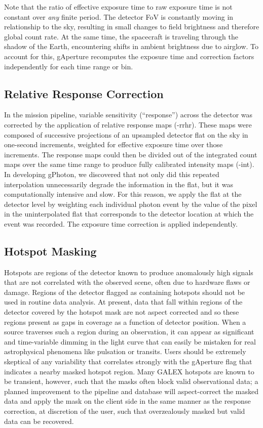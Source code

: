 \documentclass[iop]{emulateapj}
\begin{document}
Note that the ratio of effective exposure time to raw exposure time is not constant over \emph{any} finite period. The detector FoV is constantly moving in relationship to the sky, resulting in small changes to field brightness and therefore global count rate. At the same time, the spacecraft is traveling through the shadow of the Earth, encountering shifts in ambient brightness due to airglow. To account for this, gAperture recomputes the exposure time and correction factors independently for each time range or bin.

\subsection{Relative Response Correction}
\label{relresponsecorr}
In the mission pipeline, variable sensitivity (``response'') across the detector was corrected by the application of relative response maps (-rrhr). These maps were composed of successive projections of an upsampled detector flat on the sky in one-second increments, weighted for effective exposure time over those increments. The response maps could then be divided out of the integrated count maps over the same time range to produce fully calibrated intensity maps (-int). In developing gPhoton, we discovered that not only did this repeated interpolation unnecessarily degrade the information in the flat, but it was computationally intensive and slow. For this reason, we apply the flat at the detector level by weighting each individual photon event by the value of the pixel in the uninterpolated flat that corresponds to the detector location at which the event was recorded. The exposure time correction is applied independently.

\subsection{Hotspot Masking}
\label{hotspot}
Hotspots are regions of the detector known to produce anomalously high signals that are not correlated with the observed scene, often due to hardware flaws or damage. Regions of the detector flagged as containing hotspots should not be used in routine data analysis. At present, data that fall within regions of the detector covered by the hotspot mask are not aspect corrected and so these regions present as gaps in coverage as a function of detector position. When a source traverses such a region during an observation, it can appear as significant and time-variable dimming in the light curve that can easily be mistaken for real astrophysical phenomena like pulsation or transits. Users should be extremely skeptical of any variability that correlates strongly with the gAperture flag that indicates a nearby masked hotspot region. Many GALEX hotspots are known to be transient, however, such that the masks often block valid observational data; a planned improvement to the pipeline and database will aspect-correct the masked data and apply the mask on the client side in the same manner as the response correction, at discretion of the user, such that overzealously masked but valid data can be recovered.
\end{document}
